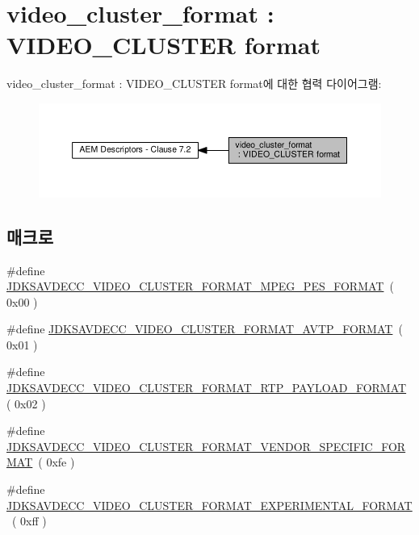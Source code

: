 \hypertarget{group__video__cluster__format}{}\section{video\+\_\+cluster\+\_\+format \+: V\+I\+D\+E\+O\+\_\+\+C\+L\+U\+S\+T\+ER format}
\label{group__video__cluster__format}
video\+\_\+cluster\+\_\+format \+: V\+I\+D\+E\+O\+\_\+\+C\+L\+U\+S\+T\+ER format에 대한 협력 다이어그램\+:
\nopagebreak
\begin{figure}[H]
\begin{center}
\leavevmode
\includegraphics[width=350pt]{group__video__cluster__format}
\end{center}
\end{figure}
\subsection*{매크로}
\begin{DoxyCompactItemize}
\item 
\#define \hyperlink{group__video__cluster__format_ga9b9e7d3b0ce093a864af31cc5943c7d1}{J\+D\+K\+S\+A\+V\+D\+E\+C\+C\+\_\+\+V\+I\+D\+E\+O\+\_\+\+C\+L\+U\+S\+T\+E\+R\+\_\+\+F\+O\+R\+M\+A\+T\+\_\+\+M\+P\+E\+G\+\_\+\+P\+E\+S\+\_\+\+F\+O\+R\+M\+AT}~( 0x00 )
\item 
\#define \hyperlink{group__video__cluster__format_gaea6cd37b9bc58c57d637339fccea080c}{J\+D\+K\+S\+A\+V\+D\+E\+C\+C\+\_\+\+V\+I\+D\+E\+O\+\_\+\+C\+L\+U\+S\+T\+E\+R\+\_\+\+F\+O\+R\+M\+A\+T\+\_\+\+A\+V\+T\+P\+\_\+\+F\+O\+R\+M\+AT}~( 0x01 )
\item 
\#define \hyperlink{group__video__cluster__format_ga80d76c269d612cdad109456c0ff2b43c}{J\+D\+K\+S\+A\+V\+D\+E\+C\+C\+\_\+\+V\+I\+D\+E\+O\+\_\+\+C\+L\+U\+S\+T\+E\+R\+\_\+\+F\+O\+R\+M\+A\+T\+\_\+\+R\+T\+P\+\_\+\+P\+A\+Y\+L\+O\+A\+D\+\_\+\+F\+O\+R\+M\+AT}~( 0x02 )
\item 
\#define \hyperlink{group__video__cluster__format_ga6aace470d42d79d69a85674fa2498c7e}{J\+D\+K\+S\+A\+V\+D\+E\+C\+C\+\_\+\+V\+I\+D\+E\+O\+\_\+\+C\+L\+U\+S\+T\+E\+R\+\_\+\+F\+O\+R\+M\+A\+T\+\_\+\+V\+E\+N\+D\+O\+R\+\_\+\+S\+P\+E\+C\+I\+F\+I\+C\+\_\+\+F\+O\+R\+M\+AT}~( 0xfe )
\item 
\#define \hyperlink{group__video__cluster__format_ga66b85ba4baad63fbb51276dc1c0e3d86}{J\+D\+K\+S\+A\+V\+D\+E\+C\+C\+\_\+\+V\+I\+D\+E\+O\+\_\+\+C\+L\+U\+S\+T\+E\+R\+\_\+\+F\+O\+R\+M\+A\+T\+\_\+\+E\+X\+P\+E\+R\+I\+M\+E\+N\+T\+A\+L\+\_\+\+F\+O\+R\+M\+AT}~( 0xff )
\end{DoxyCompactItemize}


